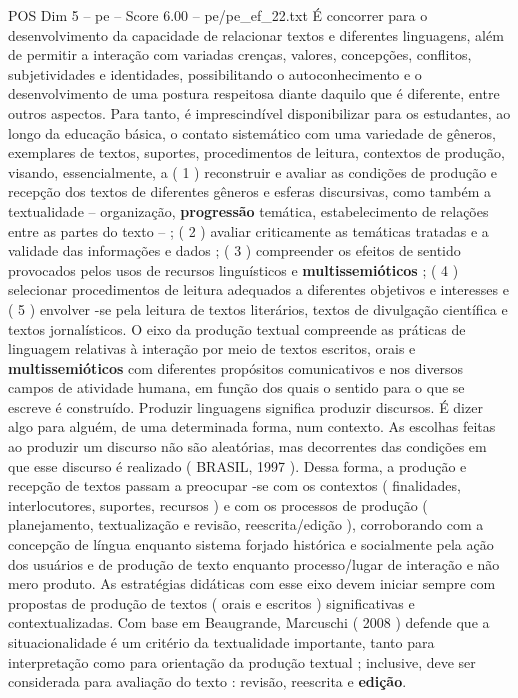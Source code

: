 \begin{textsample}{POS Dim 5 – pe – Score 6.00 – pe/pe\_ef\_22.txt}
É concorrer para o desenvolvimento da capacidade de relacionar textos e diferentes linguagens, além de permitir a interação com variadas crenças, valores, concepções, conflitos, subjetividades e identidades, possibilitando o autoconhecimento e o desenvolvimento de uma postura respeitosa diante daquilo que é diferente, entre outros aspectos.
Para tanto, é imprescindível disponibilizar para os estudantes, ao longo da educação básica, o contato sistemático com uma variedade de gêneros, exemplares de textos, suportes, procedimentos de leitura, contextos de produção, visando, essencialmente, a ( 1 ) reconstruir e avaliar as condições de produção e recepção dos textos de diferentes gêneros e esferas discursivas, como também a textualidade – organização, \textbf{progressão} temática, estabelecimento de relações entre as partes do texto – ; ( 2 ) avaliar criticamente as temáticas tratadas e a validade das informações e dados ; ( 3 ) compreender os efeitos de sentido provocados pelos usos de recursos linguísticos e \textbf{multissemióticos} ; ( 4 ) selecionar procedimentos de leitura adequados a diferentes objetivos e interesses e ( 5 ) envolver -se pela leitura de textos literários, textos de divulgação científica e textos jornalísticos.
O eixo da produção textual compreende as práticas de linguagem relativas à interação por meio de textos escritos, orais e \textbf{multissemióticos} com diferentes propósitos comunicativos e nos diversos campos de atividade humana, em função dos quais o sentido para o que se escreve é construído.
Produzir linguagens significa produzir discursos.
É dizer algo para alguém, de uma determinada forma, num contexto.
As escolhas feitas ao produzir um discurso não são aleatórias, mas decorrentes das condições em que esse discurso é realizado ( BRASIL, 1997 ).
Dessa forma, a produção e recepção de textos passam a preocupar -se com os contextos ( finalidades, interlocutores, suportes, recursos ) e com os processos de produção ( planejamento, textualização e revisão, reescrita/edição ), corroborando com a concepção de língua enquanto sistema forjado histórica e socialmente pela ação dos usuários e de produção de texto enquanto processo/lugar de interação e não mero produto.
As estratégias didáticas com esse eixo devem iniciar sempre com propostas de produção de textos ( orais e escritos ) significativas e contextualizadas.
Com base em Beaugrande, Marcuschi ( 2008 ) defende que a situacionalidade é um critério da textualidade importante, tanto para interpretação como para orientação da produção textual ; inclusive, deve ser considerada para avaliação do texto : revisão, reescrita e \textbf{edição}.

\end{textsample}
